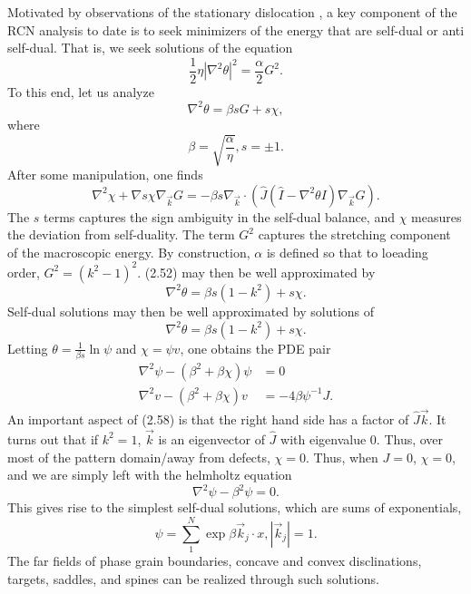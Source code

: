 \documentclass[12pt]{article}
\numberwithin{equation}{section}
\begin{document}
\par Motivated by observations of the stationary dislocation \cite{NEWELL1996}, a key component of the RCN analysis to date is to seek minimizers of the energy that are self-dual or anti self-dual. That is, we seek solutions of the equation
\begin{equation}
    \frac{1}{2}\eta|\nabla^2 \theta|^2 = \frac{\alpha}{2}G^2.
\end{equation}
To this end, let us analyze
\begin{equation}
    \nabla^2\theta = \beta s G + s \chi,
\end{equation}
where
\begin{equation}
    \beta = \sqrt{\frac{\alpha}{\eta}}, s = \pm 1.
\end{equation}
After some manipulation, one finds
\begin{equation}
    \nabla^2\chi + \nabla s\chi \nabla_{\vec{k}}G = -\beta s \nabla_{\vec{k}}\cdot \left(\hat{J}(\hat{I}-\nabla^2\theta I)\nabla_{\vec{k}}G\right).
\end{equation}
The $s$ terms captures the sign ambiguity in the self-dual balance, and $\chi$ measures the deviation from self-duality.
The term $G^2$ captures the stretching component of the macroscopic energy. By construction, $\alpha$ is defined so that to loeading order, $G^2 = (k^2 - 1)^2.$ (2.52) may then be well approximated by
\begin{equation}
    \nabla^2\theta = \beta s (1-k^2)+s\chi.
\end{equation}
Self-dual solutions may then be well approximated by solutions of
\begin{equation}
    \nabla^2\theta = \beta s (1-k^2)+s\chi.
\end{equation}
Letting $\theta = \frac{1}{\beta s}\ln{\psi}$ and $\chi = \psi v$, one obtains the PDE pair
\begin{align}
    \nabla^2 \psi - (\beta^2 + \beta\chi)\psi &= 0\\
    \nabla^2v - (\beta^2+\beta\chi)v &= -4\beta \psi^{-1}J.
\end{align}
An important aspect of (2.58) is that the right hand side has a factor of $\hat{J}\vec{k}$. It turns out that if $k^2 = 1$, $\vec{k}$ is an eigenvector of $\hat{J}$ with eigenvalue $0$. Thus, over most of the pattern domain/away from defects, $\chi = 0$.
Thus, when $J = 0$, $\chi = 0$, and we are simply left with the helmholtz equation
\begin{equation}
    \nabla^2 \psi - \beta^2\psi = 0.
\end{equation}
This gives rise to the simplest self-dual solutions, which are sums of exponentials,
\begin{equation}
    \psi = \sum_{1}^{N}\exp{\beta \vec{k}_j \cdot x}, |\vec{k}_j| = 1.
\end{equation}
The far fields of phase grain boundaries, concave and convex disclinations, targets, saddles, and spines can be realized through such solutions.
\end{document}
